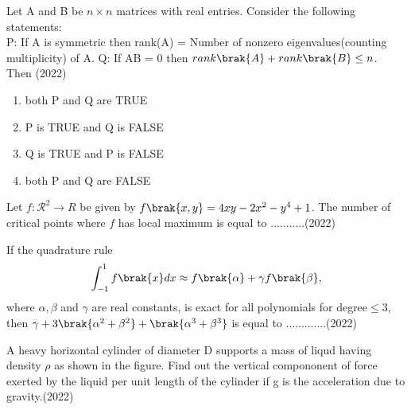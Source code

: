     \item Let A and B be $n\times n$ matrices with real entries. Consider the following statements:\\
    P: If A is symmetric then rank(A) = Number of nonzero eigenvalues(counting multiplicity) of A.
    Q: If AB = 0 then $rank\brak{A} + rank\brak{B}\leq n$.\\
    Then \hfill (2022)
    \begin{enumerate}[label = (\Alph*)]
        \item both P and Q are TRUE
        \item P is TRUE and Q is FALSE 
        \item Q is TRUE and P is FALSE
        \item both P and Q are FALSE  
    \end{enumerate}
    \item Let $f:\mathcal{R}^2\to R$ be given by $f\brak{x,y} = 4xy-2x^2-y^4+1$. The number of critical points where $f$ has local maximum is equal to ...........\hfill (2022)
    \item If the quadrature rule $$\int_{-1}^{1}f\brak{x}dx\approx f\brak{\alpha} + \gamma f\brak{\beta},$$ where $\alpha,\beta$ and $\gamma$ are real constants, is exact for all polynomials for degree$\leq 3$, then $\gamma + 3\brak{\alpha^2 + \beta^2} + \brak{\alpha^3 + \beta^3}$ is equal to .............\hfill (2022)
    \item A heavy horizontal cylinder of diameter D supports a mass of liqud having density $\rho$ as shown in the figure. Find out the vertical compononent of force exerted by the liquid per unit length of the cylinder if g is the acceleration due to gravity.\hfill (2022)
    \begin{figure}[!ht]
        \centering
        \caption{}
    \end{figure}
